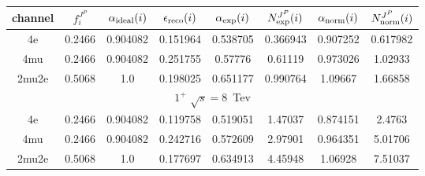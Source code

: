 \begin{table}[b]
\begin{tabular}{c c c c c c c c}
channel & $f_{i}^{J^P}$ & $\alpha_{\rm ideal} (i)$ & $\epsilon_{\rm reco} (i)$ & $\alpha_{\rm exp} (i)$ & $N^{J^P}_{\rm exp} (i)$ & $\alpha_{\rm norm} (i)$ & $N^{J^P}_{\rm norm} (i)$\\ \hline 
4e & 0.2466 & 0.904082 & 0.151964 & 0.538705
 & 0.366943%
 & 0.907252 & 0.617982 \\ \hline 
4mu & 0.2466 & 0.904082 & 0.251755 & 0.57776
 & 0.61119%
 & 0.973026 & 1.02933 \\ \hline 
2mu2e & 0.5068 & 1.0  & 0.198025 & 0.651177
 & 0.990764%
 & 1.09667 & 1.66858 \\ \hline \hline 

 \multicolumn{8}{|c|}{$1^{+}$ $\sqrt{s}=8$~Tev} \\ \hline 

4e & 0.2466 & 0.904082 & 0.119758 & 0.519051
 & 1.47037%
 & 0.874151 & 2.4763 \\ \hline 
4mu & 0.2466 & 0.904082 & 0.242716 & 0.572609
 & 2.97901%
 & 0.964351 & 5.01706 \\ \hline 
2mu2e & 0.5068 & 1.0  & 0.177697 & 0.634913
 & 4.45948%
 & 1.06928 & 7.51037 \\ \hline \hline 
\end{tabular}
\label{table:HZZ4lyieldcorr_spin1}
\end{table}


